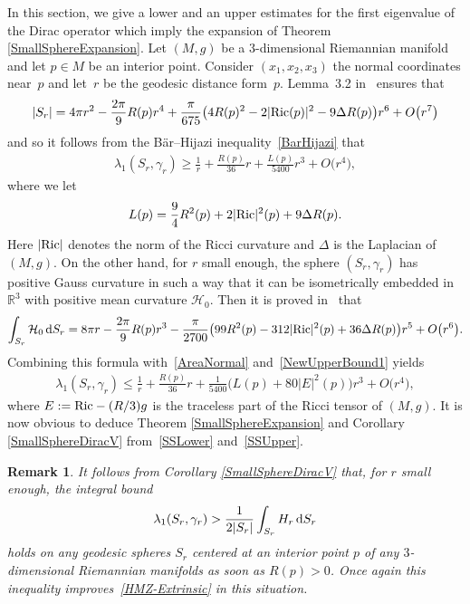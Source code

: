 \documentclass[10pt,a4paper]{amsart}
\numberwithin{equation}{section}
\newtheorem{Remark}[Theorem]{Remark}
\begin{document}
In this section, we give a lower and an upper estimates for the first eigenvalue of the Dirac operator which imply the expansion of Theorem \ref{SmallSphereExpansion}. Let $(M,g)$ be a $3$-dimensional Riemannian manifold and let $p\in M$ be an interior point. Consider $(x_1,x_2,x_3)$ the normal coordinates near~$p$ and let~$r$ be the geodesic distance form~$p$. Lemma~3.2 in~\cite{FanShiTam} ensures that
\begin{gather}\label{AreaNormal}
|S_r|=4\pi r^2-\frac{2\pi}{9}R(p)r^4+\frac{\pi}{675}\big(4R(p)^2-2|{\rm Ric}(p)|^2-9\Delta R(p)\big)r^6+O\big(r^7\big)
\end{gather}
and so it follows from the B\"ar--Hijazi inequality~\eqref{BarHijazi} that
\begin{gather}\label{SSLower}
\lambda_1(S_r,\gamma_r)\geq\frac{1}{r}+\frac{R(p)}{36}r+\frac{L(p)}{5400}r^3+O\big(r^4\big),
\end{gather}
where we let
\begin{gather*}
L(p)=\frac{9}{4}R^2(p)+2|{\rm Ric}|^2(p)+9\Delta R(p).
\end{gather*}
Here $|{\rm Ric}|$ denotes the norm of the Ricci curvature and $\Delta$ is the Laplacian of $(M,g)$. On the other hand, for $r$ small enough, the sphere $(S_r,\gamma_r)$ has positive Gauss curvature in such a way that it can be isometrically embedded in $\mathbb{R}^3$ with positive mean curvature $\mathcal{H}_0$. Then it is proved in~\cite[p. 66]{FanShiTam} that
\begin{gather*}
\int_{S_r}\mathcal{H}_0\,{\rm d}S_r=8\pi r-\frac{2\pi}{9}R(p)r^3-\frac{\pi}{2700}\big(99R^2(p)-312|{\rm Ric}|^2(p)+36\Delta R(p)\big)r^5+O\big(r^6\big).
\end{gather*}
Combining this formula with~\eqref{AreaNormal} and~\eqref{NewUpperBound1} yields
\begin{gather}\label{SSUpper}
\lambda_1(S_r,\gamma_r)\leq\frac{1}{r}+\frac{R(p)}{36}r+\frac{1}{5400}\big(L(p)+80|E|^2(p)\big)r^3+O\big(r^4\big),
\end{gather}
where $E:={\rm Ric}-(R/3)g$ is the traceless part of the Ricci tensor of $(M,g)$. It is now obvious to deduce Theorem \ref{SmallSphereExpansion} and Corollary \ref{SmallSphereDiracV} from~\eqref{SSLower} and~\eqref{SSUpper}.

\begin{Remark}
It follows from Corollary \ref{SmallSphereDiracV} that, for $r$ small enough, the integral bound
\begin{gather*}%
\lambda_1(S_r,\gamma_r)>\frac{1}{2|S_r|}\int_{S_r}H_r\,{\rm d}S_r
\end{gather*}
holds on any geodesic spheres $S_r$ centered at an interior point $p$ of any $3$-dimensional Riemannian manifolds as soon as $R(p)>0$. Once again this inequality improves~\eqref{HMZ-Extrinsic} in this situation.
\end{Remark}
\end{document}
